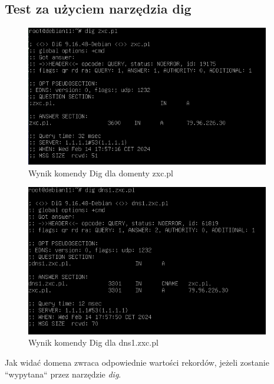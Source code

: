 \documentclass[12pt, a4paper]{article}
\begin{document}
    \subsection{Test za użyciem narzędzia dig}
        \begin{figure}[!h]
            \centering
            \includegraphics[width=0.95\textwidth]{7.PNG}
            \caption{Wynik komendy Dig dla domenty zxc.pl}
            \label{fig:dig1}
        \end{figure}
        \begin{figure}[!h]
            \centering
            \includegraphics[width=0.95\textwidth]{8.PNG}
            \caption{Wynik komendy Dig dla dns1.zxc.pl}
            \label{fig:dig2}
        \end{figure}
        Jak widać domena zwraca odpowiednie wartości rekordów, jeżeli zostanie ``wypytana`` przez narzędzie \textit{dig}. 
\end{document}
